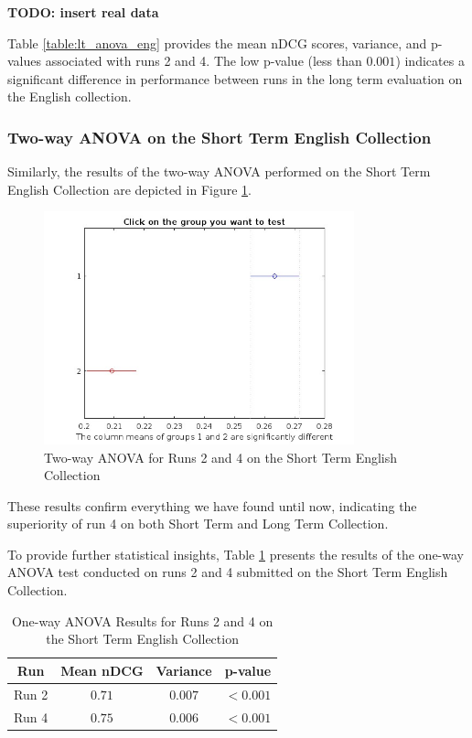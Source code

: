 \begin{center}
    \textbf{TODO: insert real data}
\end{center}

Table \ref{table:lt_anova_eng} provides the mean \ac{nDCG} scores, variance, and p-values associated with runs 2 and 4. 
The low p-value (less than $0.001$) indicates a significant difference in performance between runs in the long term evaluation on the English collection.

\subsubsection{Two-way \ac{ANOVA} on the Short Term English Collection}

Similarly, the results of the two-way \ac{ANOVA} performed on the Short Term English Collection are depicted in Figure \ref{fig:st_anova_eng}.

\begin{figure}[!h]
\centering
\includegraphics[width=0.8\textwidth]{figure/StatisticalAnalysis/AnovaTwoWay/ST_EN.jpg}
\caption{Two-way ANOVA for Runs 2 and 4 on the Short Term English Collection}
\label{fig:st_anova_eng}
\end{figure}

These results confirm everything we have found until now, indicating the superiority of run 4 on both Short Term and Long Term Collection.

To provide further statistical insights, Table \ref{table:st_anova_eng} presents the results of the one-way \ac{ANOVA} test conducted on runs 2 and 4 submitted on the Short Term English Collection.

\begin{table}[htbp]
\centering
\caption{One-way \ac{ANOVA} Results for Runs 2 and 4 on the Short Term English Collection}
\label{table:st_anova_eng}
\begin{tabular}{cccc}
\toprule
\textbf{Run} & \textbf{Mean nDCG} & \textbf{Variance} & \textbf{p-value} \\
\midrule
Run 2 & $0.71$ & $0.007$ & $<0.001$ \\
Run 4 & $0.75$ & $0.006$ & $<0.001$ \\
\bottomrule
\end{tabular}
\end{table}

